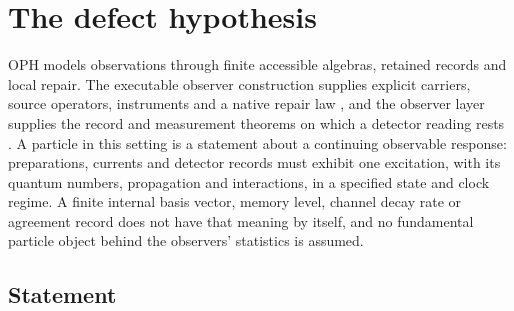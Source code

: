 \documentclass[11pt]{article}
\begin{document}
\tableofcontents

\section{The defect hypothesis}
\label{sec:defect-hypothesis}

OPH models observations through finite accessible algebras, retained records
and local repair. The executable observer construction supplies explicit
carriers, source operators, instruments and a native repair law
\cite{ophmodel,ophrepairlaw}, and the observer layer supplies the record and
measurement theorems on which a detector reading rests \cite{ophobservers}. A particle in this setting is a statement about
a continuing observable response: preparations, currents and detector
records must exhibit one excitation, with its quantum numbers, propagation
and interactions, in a specified state and clock regime. A finite internal
basis vector, memory level, channel decay rate or agreement record does not
have that meaning by itself, and no fundamental particle object behind the
observers' statistics is assumed.

\subsection{Statement}
\end{document}
